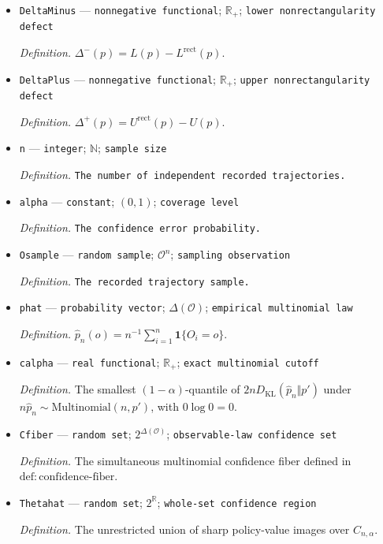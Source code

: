 \documentclass{article}
\begin{document}
\begin{itemize}
  \item \texttt{DeltaMinus} --- \texttt{nonnegative functional}; \(\mathbb R_+\); \texttt{lower nonrectangularity defect}
  \par\smallskip\noindent\emph{Definition.} \(\Delta^-(p)=L(p)-L^{\mathrm{rect}}(p)\).
  \item \texttt{DeltaPlus} --- \texttt{nonnegative functional}; \(\mathbb R_+\); \texttt{upper nonrectangularity defect}
  \par\smallskip\noindent\emph{Definition.} \(\Delta^+(p)=U^{\mathrm{rect}}(p)-U(p)\).
  \item \texttt{n} --- \texttt{integer}; \(\mathbb N\); \texttt{sample size}
  \par\smallskip\noindent\emph{Definition.} \texttt{The number of independent recorded trajectories.}
  \item \texttt{alpha} --- \texttt{constant}; \((0,1)\); \texttt{coverage level}
  \par\smallskip\noindent\emph{Definition.} \texttt{The confidence error probability.}
  \item \texttt{Osample} --- \texttt{random sample}; \(\mathcal O^n\); \texttt{sampling observation}
  \par\smallskip\noindent\emph{Definition.} \texttt{The recorded trajectory sample.}
  \item \texttt{phat} --- \texttt{probability vector}; \(\Delta(\mathcal O)\); \texttt{empirical multinomial law}
  \par\smallskip\noindent\emph{Definition.} \(\widehat p_n(o)=n^{-1}\sum_{i=1}^n\mathbf 1\{O_i=o\}\).
  \item \texttt{calpha} --- \texttt{real functional}; \(\mathbb R_+\); \texttt{exact multinomial cutoff}
  \par\smallskip\noindent\emph{Definition.} The smallest \((1-\alpha)\)-quantile of \(2nD_{\mathrm{KL}}(\widehat p_n\Vert p')\) under \(n\widehat p_n\sim\mathrm{Multinomial}(n,p')\), with \(0\log 0=0\).
  \item \texttt{Cfiber} --- \texttt{random set}; \(2^{\Delta(\mathcal O)}\); \texttt{observable-\allowbreak{}law confidence set}
  \par\smallskip\noindent\emph{Definition.} The simultaneous multinomial confidence fiber defined in \(\mathrm{def{:}confidence\text{-}fiber}\).
  \item \texttt{Thetahat} --- \texttt{random set}; \(2^{\mathbb R}\); \texttt{whole-\allowbreak{}set confidence region}
  \par\smallskip\noindent\emph{Definition.} The unrestricted union of sharp policy-value images over \(C_{n,\alpha}\).

\end{itemize}
\end{document}
